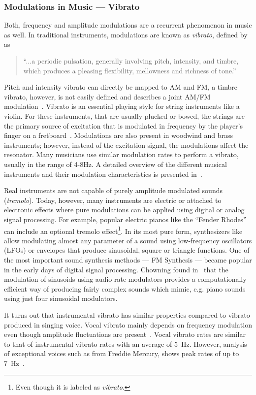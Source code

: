 \subsubsection*{Modulations in Music --- Vibrato}

Both, frequency and amplitude modulations are a recurrent phenomenon in music as well.
In traditional instruments, modulations are known as \emph{vibrato}, defined by~\cite{seashore31} as

\begin{quote}
``...a periodic pulsation, generally involving pitch, intensity, and timbre, which produces a pleasing flexibility, mellowness and richness of tone.''
\end{quote}

Pitch and intensity vibrato can directly be mapped to \acs{AM} and \acs{FM}, a timbre vibrato, however, is not easily defined and describes a joint \acs{AM}/\acs{FM} modulation~\cite{desain99}.
Vibrato is an essential playing style for string instruments like a violin. 
For these instruments, that are usually plucked or bowed, the strings are the primary source of excitation that is modulated in frequency by the player's finger on a fretboard~\cite{macleod06}.
Modulations are also present in woodwind and brass instruments; however, instead of the excitation signal, the modulations affect the resonator.
Many musicians use similar modulation rates to perform a vibrato, usually in the range of 4-8\si{\hertz}.
A detailed overview of the different musical instruments and their modulation characteristics is presented in~\cite{fletcher01}.
\par
Real instruments are not capable of purely amplitude modulated sounds (\emph{tremolo}). 
Today, however, many instruments are electric or attached to electronic effects where pure modulations can be applied using digital or analog signal processing.
For example, popular electric pianos like the ``Fender Rhodes'' can include an optional tremolo effect\footnote{Even though it is labeled as \emph{vibrato}.}.
In its most pure form, synthesizers like~\cite{pinch09, buchla05} allow modulating almost any parameter of a sound using low-frequency oscillators (LFOs) or envelopes that produce sinusoidal, square or triangle functions.
One of the most important sound synthesis methods --- FM Synthesis --- became popular in the early days of digital signal processing. 
Chowning found in~\cite{chowning73} that the modulation of sinusoids using audio rate modulators provides a computationally efficient way of producing fairly complex sounds which mimic, e.g. piano sounds using just four sinusoidal modulators.
\par
It turns out that instrumental vibrato has similar properties compared to vibrato produced in singing voice.
Vocal vibrato mainly depends on frequency modulation even though amplitude fluctuations are present~\cite{sundberg94}. 
Vocal vibrato rates are similar to that of instrumental vibrato rates with an average of 5~\si{\hertz}.
However, analysis of exceptional voices such as from Freddie Mercury, shows peak rates of up to 7~\si{\hertz}~\cite{herbst17}.

